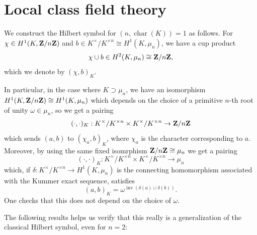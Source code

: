 \documentclass{article}
\begin{document}
\section{Local class field theory}
\begin{constr}
		We construct the Hilbert symbol for $(n,\operatorname{char}(K))=1$ as follows. For $\chi\in H^1(K,\mathbf{Z}/n\mathbf{Z})$ and $b\in K^\times / K^{\times n}\cong H^1(K,\mu_n)$, we have a cup product
		\[
			\chi \cup b \in H^2(K,\mu_n) \cong \mathbf{Z}/n\mathbf{Z},
		\]
		which we denote by $(\chi,b)_K$.
		
		In particular, in the case where $K\supset \mu_n$, we have an isomorphism $H^1(K,\mathbf{Z} /n\mathbf{Z})\cong H^1(K,\mu_n)$ which depends on the choice of a primitive $n$-th root of unity $\omega\in \mu_n$, so we get a pairing
		\[
			(\cdot,\cdot)_K: K^\times / K^{\times n} \times K^\times / K^{\times n} \to \mathbf{Z}/n\mathbf{Z}
		\]
		which sends $(a,b)$ to $(\chi_a,b)_K$, where $\chi_a$ is the character corresponding to $a$. Moreover, by using the same fixed isomrphism $\mathbf{Z}/n\mathbf{Z} \cong \mu_n$ we get a pairing
		\[
			(\cdot,\cdot)_K: K^\times / K^{\times n} \times K^\times / K^{\times n} \to \mu_n
		\]
		which, if $\delta: K^\times / K^{\times n} \to H^1(K,\mu_n)$ is the connecting homomorphism associated with the Kummer exact sequence, satisfies $$(a,b)_K = \omega^{\operatorname{inv}(\delta(a)\cup \delta(b))}.$$ One checks that this does not depend on the choice of $\omega$.
\end{constr}

The following results helps us verify that this really is a generalization of the classical Hilbert symbol, even for $n=2$:
\end{document}
